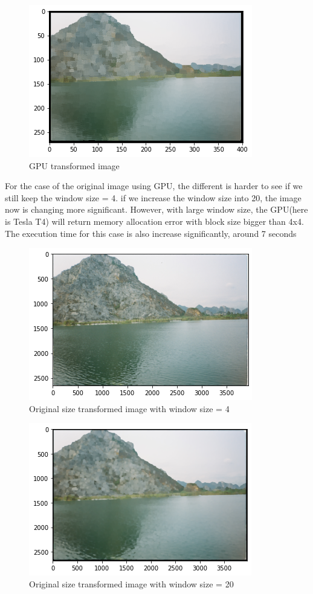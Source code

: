 \documentclass{article}
\begin{document}
\begin{figure}
    \begin{center}
        \includegraphics[scale = 0.5]{gpu-resize.png}
        \caption{GPU transformed image}
    \end{center}
\end{figure}

For the case of the original image using GPU, the different is harder to see if we still keep the window size = 4. if we increase the window size into 20, the image now is changing more significant. However, with large window size, the GPU(here is Tesla T4) will return memory allocation error with block size bigger than 4x4. The execution time for this case is also increase significantly, around 7 seconds


\begin{figure}
    \begin{center}
        \includegraphics[scale = 0.5]{gpu - size3.png}
        \caption{Original size transformed image with window size = 4}
    \end{center}
\end{figure}


\begin{figure}
    \begin{center}
        \includegraphics[scale = 0.5]{gpu-size20.png}
        \caption{Original size transformed image with window size = 20}
    \end{center}
\end{figure}
\end{document}
